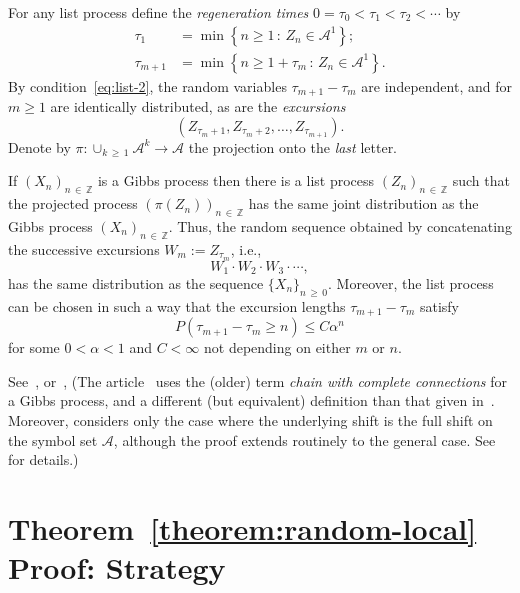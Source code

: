 \documentclass[10pt]{amsart}
\theoremstyle{definition}\newtheorem{defi}[theo]{Definition}\newtheorem{rema}[theo]{Remark}\newtheorem{exam}[theo]{Example}\newtheorem{exem}[theo]{Example}\newtheorem{nota}[theo]{Notation}
\newcommand{\zz}[1]{\mathbb #1}
\begin{document}
For any list process define the \emph{regeneration times} $0=\tau_{0}<\tau_{1}<\tau_{2}<\dotsb$ by
\begin{align*}
\tau_{1}&=\min \left\{n\geq 1\,:\, Z_{n}\in \mathcal{A}^{1}\right\};\\
\tau_{m+1}&=\min \left\{n\geq 1+\tau_{m}\,:\, Z_{n}\in \mathcal{A}^{1}\right\}.
\end{align*}
By condition~\eqref{eq:list-2}, the random variables $\tau_{m+1}-\tau_{m}$ are independent, and for $m\geq 1$ are identically distributed, as are the \emph{excursions}
\[
\left(Z_{\tau_{m}+1},Z_{\tau_{m}+2},\dotsc,Z_{\tau_{m+1}}\right).
\]
Denote by $\pi :\cup_{k\,\geq\,1}\mathcal{A}^{k} \rightarrow \mathcal{A}$ the projection onto the \emph{last} letter.

\begin{prop}\label{proposition:regeneration}
If $(X_{n})_{n\,\in\,\zz{Z}}$ is a Gibbs process then there is a list process $(Z_{n})_{n\,\in\,\zz{Z}}$ such that the projected process $(\pi (Z_{n}))_{n\,\in\,\zz{Z}}$ has the same joint distribution as the Gibbs process $(X_{n})_{n\,\in\,\zz{Z}}$. Thus, the random sequence obtained by concatenating the successive excursions $W_{m}:=Z_{\tau_{m}}$, i.e.,
\[
W_{1}\cdot W_{2}\cdot W_{3}\cdot\dotsb,
\]
has the same distribution as the sequence $\{X_{n} \}_{n\, \geq\,0}$. Moreover, the list process can be chosen in such a way that the excursion lengths $\tau_{m+1}-\tau_{m}$ satisfy
\begin{equation}\label{eq:exp-regeneration}
P (\tau_{m+1}-\tau_{m}\geq n)\leq C\alpha^{n}
\end{equation}
for some $0<\alpha <1$ and $C<\infty$ not depending on either $m$ or $n$.
\end{prop}

See~\cite[Theorem~1]{lalley:regeneration}, or~\cite[Theorem~4.1.]{comets-et-al}, (The article~\cite{lalley:regeneration} uses the (older) term \emph{chain with complete connections} for a Gibbs process, and a different (but equivalent) definition than that given in~\cite{bowen:book}. Moreover,\cite{lalley:regeneration} considers only the case where the underlying shift is the full shift on the symbol set $\mathcal{A}$, although the proof extends routinely to the general case. See~\cite{li-naud-pan} for details.)



\section{Theorem~\ref{theorem:random-local} Proof: Strategy}\label{sec:heuristics}
\end{document}
